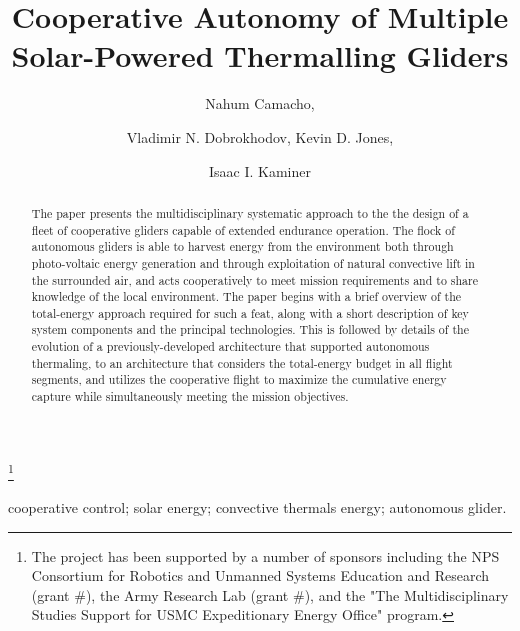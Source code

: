 \documentclass{ifacconf}
\begin{document}
\begin{frontmatter}

\title{Cooperative Autonomy of Multiple Solar-Powered Thermalling Gliders }

\thanks[footnoteinfo]{The project has been supported by a number of sponsors including the NPS Consortium for Robotics and Unmanned Systems Education and Research (grant $\#$), the Army Research Lab (grant $\#$), and the "The Multidisciplinary Studies Support for USMC Expeditionary Energy Office" program.}

\author[First]{Nahum Camacho,}
\author[Second]{Vladimir N. Dobrokhodov, Kevin D. Jones,}
\author[Third]{Isaac I. Kaminer}

\address[First]{Graduate student at the Department  of Mechanical and Aerospace Engineering, Naval Postgraduate School, Monterey, CA 93943 USA (e-mail: ncamacho@nps.edu)}
\address[Second]{Research Associate Professors at the Department  of Mechanical and Aerospace Engineering, Naval Postgraduate School, Monterey, CA 93943 USA (e-mail: {vndobrok, kdjones}@nps.edu)}
\address[Third]{Professor at the Department  of Mechanical and Aerospace Engineering, Naval Postgraduate School, Monterey, CA 93943 USA (e-mail: kaminer@nps.edu)}


\begin{keyword}                           %
cooperative control; solar energy; convective thermals energy; autonomous glider.
\end{keyword}                             %


\begin{abstract}                          %
The paper presents the multidisciplinary systematic approach to the the design of a fleet of cooperative gliders capable of extended endurance operation. The flock of autonomous gliders is able to harvest energy from the environment both through photo-voltaic energy generation and through exploitation of natural convective lift in the surrounded air, and acts cooperatively to meet mission requirements and to share knowledge of the local environment. The paper begins with a brief overview of the total-energy approach required for such a feat, along with a short description of key system components and the principal technologies. This is followed by details of the evolution of a previously-developed architecture that supported autonomous thermaling, to an architecture that considers the total-energy budget in all flight segments, and utilizes the cooperative flight to maximize the  cumulative energy capture while simultaneously meeting the mission objectives.
\end{abstract}

\end{frontmatter}
\end{document}
